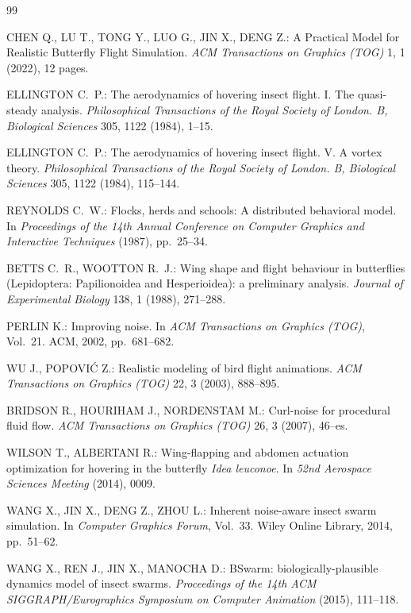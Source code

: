 \documentclass[12pt]{article}
\begin{document}
\begin{thebibliography}{99}

CHEN Q., LU T., TONG Y., LUO G., JIN X., DENG Z.:
A Practical Model for Realistic Butterfly Flight Simulation.
\textit{ACM Transactions on Graphics (TOG)} 1, 1 (2022), 12 pages.

ELLINGTON C.~P.:
The aerodynamics of hovering insect flight. I. The quasi-steady analysis.
\textit{Philosophical Transactions of the Royal Society of London. B,
Biological Sciences} 305, 1122 (1984), 1--15.

ELLINGTON C.~P.:
The aerodynamics of hovering insect flight. V. A vortex theory.
\textit{Philosophical Transactions of the Royal Society of London. B,
Biological Sciences} 305, 1122 (1984), 115--144.

REYNOLDS C.~W.:
Flocks, herds and schools: A distributed behavioral model.
In \textit{Proceedings of the 14th Annual Conference on Computer Graphics
and Interactive Techniques} (1987), pp.~25--34.

BETTS C.~R., WOOTTON R.~J.:
Wing shape and flight behaviour in butterflies (Lepidoptera: Papilionoidea
and Hesperioidea): a preliminary analysis.
\textit{Journal of Experimental Biology} 138, 1 (1988), 271--288.

PERLIN K.:
Improving noise.
In \textit{ACM Transactions on Graphics (TOG)}, Vol.~21.
ACM, 2002, pp.~681--682.

WU J., POPOVI\'C Z.:
Realistic modeling of bird flight animations.
\textit{ACM Transactions on Graphics (TOG)} 22, 3 (2003), 888--895.

BRIDSON R., HOURIHAM J., NORDENSTAM M.:
Curl-noise for procedural fluid flow.
\textit{ACM Transactions on Graphics (TOG)} 26, 3 (2007), 46--es.

WILSON T., ALBERTANI R.:
Wing-flapping and abdomen actuation optimization for hovering in the
butterfly \textit{Idea leuconoe}.
In \textit{52nd Aerospace Sciences Meeting} (2014), 0009.

WANG X., JIN X., DENG Z., ZHOU L.:
Inherent noise-aware insect swarm simulation.
In \textit{Computer Graphics Forum}, Vol.~33.
Wiley Online Library, 2014, pp.~51--62.

WANG X., REN J., JIN X., MANOCHA D.:
BSwarm: biologically-plausible dynamics model of insect swarms.
\textit{Proceedings of the 14th ACM SIGGRAPH/Eurographics Symposium on
Computer Animation} (2015), 111--118.


\end{thebibliography}
\end{document}
